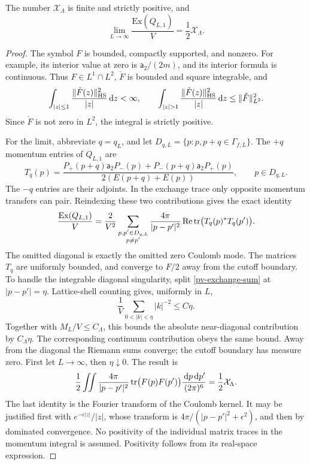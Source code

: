 \begin{lemma}
\label{pv-exchange-limit}
The number \(\mathcal X_\Lambda\) is finite and strictly positive, and
\begin{equation}
 \lim_{L\to\infty}\frac{\mathrm{Ex}(Q_{L,1})}{V}
 =\frac12\mathcal X_\Lambda.
 \label{pv-exchange-limit-formula}
\end{equation}
\end{lemma}
\begin{proof}
The symbol \(F\) is bounded, compactly supported, and nonzero. For example,
its interior value at zero is \(\mathsf a_2/(2m)\), and its interior
formula is continuous. Thus \(F\in L^1\cap L^2\), \(\check F\) is bounded
and square integrable, and
\[
 \int_{|z|\leq1}\frac{\|\check F(z)\|_{\HS}^2}{|z|}\dd z<\infty,
 \qquad
 \int_{|z|>1}\frac{\|\check F(z)\|_{\HS}^2}{|z|}\dd z
 \leq\|\check F\|_{L^2}^2.
\]
Since \(\check F\) is not zero in \(L^2\), the integral is strictly positive.

For the limit, abbreviate \(q=q_L\), and let
\(D_{q,L}=\{p:p,p+q\in\Gamma_{f,L}\}\). The \(+q\) momentum entries of
\(Q_{L,1}\) are
\[
 T_q(p)=\frac{P_+(p+q)\mathsf a_2P_-(p)
                 +P_-(p+q)\mathsf a_2P_+(p)}
                 {2(E(p+q)+E(p))},\qquad p\in D_{q,L}.
\]
The \(-q\) entries are their adjoints. In the exchange trace only
opposite momentum transfers can pair. Reindexing these two contributions
gives the exact identity
\begin{equation}
 \frac{\mathrm{Ex}(Q_{L,1})}{V}
 =\frac2{V^2}
 \sum_{\substack{p,p'\in D_{q,L}\\p\ne p'}}
 \frac{4\pi}{|p-p'|^2}
       \operatorname{Re}\operatorname{tr}\bigl(T_q(p)^*T_q(p')\bigr).
 \label{pv-exchange-sum}
\end{equation}
The omitted diagonal is exactly the omitted zero Coulomb mode.
The matrices \(T_q\) are uniformly bounded, and converge to \(F/2\)
away from the cutoff boundary. To handle the integrable diagonal
singularity, split \eqref{pv-exchange-sum} at \(|p-p'|=\eta\).
Lattice-shell counting gives, uniformly in \(L\),
\[
 \frac1V\sum_{0<|k|<\eta}|k|^{-2}\leq C\eta.
\]
Together with \(M_L/V\leq C_\Lambda\), this bounds the absolute
near-diagonal contribution by \(C_\Lambda\eta\). The corresponding
continuum contribution obeys the same bound. Away from the diagonal the
Riemann sums converge; the cutoff boundary has measure zero. First let
\(L\to\infty\), then \(\eta\downarrow0\). The result is
\[
 \frac12\iint
       \frac{4\pi}{|p-p'|^2}\operatorname{tr}\bigl(F(p)F(p')\bigr)
                      \frac{\,\mathrm d p\,\mathrm d p'}{(2\pi)^6}
 =\frac12\mathcal X_\Lambda.
\]
The last identity is the Fourier transform of the Coulomb kernel.
It may be justified first with \(e^{-\epsilon|z|}/|z|\), whose transform
is \(4\pi/(|p-p'|^2+\epsilon^2)\), and then by dominated convergence.
No positivity of the individual matrix traces in the momentum integral
is assumed. Positivity follows from its real-space expression.
\end{proof}

